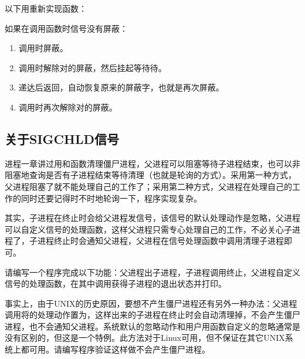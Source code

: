 以下用重新实现函数：




如果在调用函数时信号没有屏蔽：


\begin{enumerate}

\item 调用时屏蔽。

\item 调用时解除对的屏蔽，然后挂起等待待。

\item {}递达后返回，自动恢复原来的屏蔽字，也就是再次屏蔽。

\item 调用时再次解除对的屏蔽。
\end{enumerate}

\subsection{关于SIGCHLD信号}
%


进程一章讲过用和函数清理僵尸进程，父进程可以阻塞等待子进程结束，也可以非阻塞地查询是否有子进程结束等待清理（也就是轮询的方式）。采用第一种方式，父进程阻塞了就不能处理自己的工作了；采用第二种方式，父进程在处理自己的工作的同时还要记得时不时地轮询一下，程序实现复杂。



其实，子进程在终止时会给父进程发信号，该信号的默认处理动作是忽略，父进程可以自定义信号的处理函数，这样父进程只需专心处理自己的工作，不必关心子进程了，子进程终止时会通知父进程，父进程在信号处理函数中调用清理子进程即可。



请编写一个程序完成以下功能：父进程出子进程，子进程调用终止，父进程自定义信号的处理函数，在其中调用获得子进程的退出状态并打印。



事实上，由于UNIX的历史原因，要想不产生僵尸进程还有另外一种办法：父进程调用将的处理动作置为，这样出来的子进程在终止时会自动清理掉，不会产生僵尸进程，也不会通知父进程。系统默认的忽略动作和用户用函数自定义的忽略通常是没有区别的，但这是一个特例。此方法对于Linux可用，但不保证在其它UNIX系统上都可用。请编写程序验证这样做不会产生僵尸进程。

